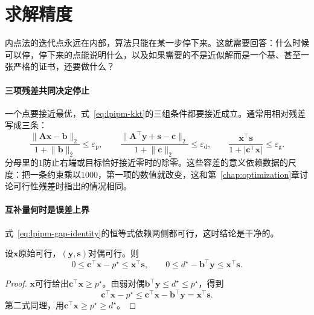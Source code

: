 \section{求解精度}
\label{sec:lpipm-accuracy}

内点法的迭代点永远在内部，算法只能在某一步停下来。这就需要回答：什么时候可以停，停下来的点能说明什么，以及如果需要的不是近似解而是一个基、甚至一张严格的证书，还要做什么？

\paragraph{三项残差共同决定停止}
一个点要接近最优，式~\eqref{eq:lpipm-kkt}的三组条件都要接近成立。通常用相对残差写成三条：
\begin{equation}
 \frac{\lVert\bm{A}\bm{x}-\bm{b}\rVert_2}{1+\lVert\bm{b}\rVert_2}\leq\varepsilon_{\mathrm{p}},\qquad
 \frac{\lVert\bm{A}^\top\bm{y}+\bm{s}-\bm{c}\rVert_2}{1+\lVert\bm{c}\rVert_2}\leq\varepsilon_{\mathrm{d}},\qquad
 \frac{\bm{x}^\top\bm{s}}{1+\lvert\bm{c}^\top\bm{x}\rvert}\leq\varepsilon_{\mathrm{g}}.
 \label{eq:lpipm-stop}
\end{equation}
分母里的$1$防止右端或目标恰好接近零时的除零。这些容差的意义依赖数据的尺度：把一条约束乘以$1000$，第一项的数值就改变，这和第~\ref{chap:optimization}章讨论可行性残差时指出的情况相同。

\paragraph{互补量何时是误差上界}
式~\eqref{eq:lpipm-gap-identity}的恒等式依赖两侧都可行，这时结论是干净的。

\begin{theorem}[可行点上的误差界]
\label{thm:lpipm-gap-bound}
设$\bm{x}$原始可行，$(\bm{y},\bm{s})$对偶可行。则
\begin{equation}
 0\leq\bm{c}^\top\bm{x}-p^\star\leq\bm{x}^\top\bm{s},\qquad
 0\leq d^\star-\bm{b}^\top\bm{y}\leq\bm{x}^\top\bm{s}.
 \label{eq:lpipm-gap-bound}
\end{equation}
\end{theorem}

\begin{proof}
$\bm{x}$可行给出$\bm{c}^\top\bm{x}\geq p^\star$。由弱对偶$\bm{b}^\top\bm{y}\leq d^\star\leq p^\star$，得到
\[
 \bm{c}^\top\bm{x}-p^\star\leq\bm{c}^\top\bm{x}-\bm{b}^\top\bm{y}=\bm{x}^\top\bm{s}.
\]
第二式同理，用$\bm{c}^\top\bm{x}\geq p^\star\geq d^\star$。
\end{proof}

